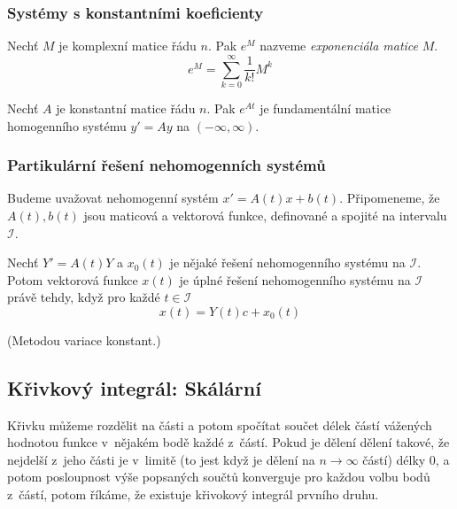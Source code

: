 \pagebreak

\subsubsection{Systémy s konstantními koeficienty}

\begin{definition}
    Nechť $M$ je komplexní matice řádu $n$. Pak $e^M$ nazveme
    {\em exponenciála matice} $M$.
\[
    e^M = \sum_{k = 0}^{\infty} \frac{1}{k!} M^k
\]
\end{definition}

\begin{theorem}
    Nechť $A$ je konstantní matice řádu $n$.
    Pak $e^{At}$ je fundamentální matice homogenního systému $y' = Ay$
    na $(-\infty, \infty)$.
\end{theorem}

\begin{example}
\end{example}

\subsubsection{Partikulární řešení nehomogenních systémů}

Budeme uvažovat nehomogenní systém $x' = A(t)x + b(t)$.
Připomeneme, že $A(t), b(t)$ jsou maticová a vektorová funkce,
definované a spojité na intervalu $\mathcal{I}$.

\begin{theorem}
    Nechť $Y' = A(t)Y$ a $x_0(t)$ je nějaké řešení nehomogenního systému
    na $\mathcal{I}$. Potom vektorová funkce $x(t)$ je úplné řešení
    nehomogenního systému na $\mathcal{I}$ právě tehdy,
    když pro každé $t \in \mathcal{I}$
    \[
        x(t) = Y(t)c + x_0(t)
    \]
\end{theorem}

\begin{example}
    (Metodou variace konstant.)
\end{example}

\subsection{Křivkový integrál: Skálární}


Křivku můžeme rozdělit na části a potom spočítat součet délek částí
vážených hodnotou funkce v~nějakém bodě každé z~částí. Pokud je dělení
dělení takové, že nejdelší z~jeho části je v~limitě (to jest když je
dělení na $n\to \infty$ částí) délky 0, a potom posloupnost výše
popsaných součtů konverguje pro každou volbu bodů z~částí, potom říkáme,
že existuje křivokový integrál prvního druhu.


